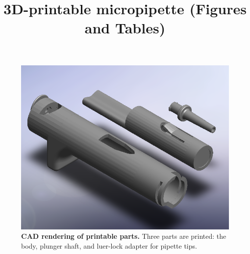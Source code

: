 \documentclass[]{article}
\title{3D-printable micropipette (Figures and Tables)}
\author{}
\begin{document}
\maketitle

\begin{figure}
\includegraphics[scale=0.4]{fig1.PNG}
\caption{
{\bf CAD rendering of printable parts.}  Three parts are printed: the body, plunger shaft, and luer-lock adapter for pipette tips.
}
\label{figure1}
\end{figure}
\end{document}
